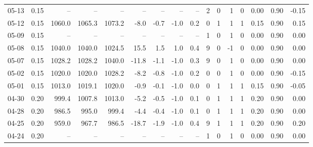 \begin{threeparttable}
{\begin{tabular}{lrrrrrrrrrrrrrrr}
  05-13 &     0.15 &     -- &     -- &     -- &         -- &             -- &                       -- &                  -- &              2 &         0 &     1 &         0 &       0.00 &      0.90 &          -0.15 \\
  05-12 &     0.15 & 1060.0 & 1065.3 & 1073.2 &       -8.0 &           -0.7 &                     -1.0 &                 0.2 &              0 &         1 &     1 &         1 &       0.15 &      0.90 &           0.15 \\
  05-09 &     0.15 &     -- &     -- &     -- &         -- &             -- &                       -- &                  -- &              1 &         0 &     1 &         0 &       0.00 &      0.90 &           0.00 \\
  05-08 &     0.15 & 1040.0 & 1040.0 & 1024.5 &       15.5 &            1.5 &                      1.0 &                 0.4 &              9 &         0 &    -1 &         0 &       0.00 &      0.90 &           0.00 \\
  05-07 &     0.15 & 1028.2 & 1028.2 & 1040.0 &      -11.8 &           -1.1 &                     -1.0 &                 0.3 &              9 &         0 &     1 &         0 &       0.00 &      0.90 &           0.00 \\
  05-02 &     0.15 & 1020.0 & 1020.0 & 1028.2 &       -8.2 &           -0.8 &                     -1.0 &                 0.2 &              0 &         0 &     1 &         0 &       0.00 &      0.90 &          -0.15 \\
  05-01 &     0.15 & 1013.0 & 1019.1 & 1020.0 &       -0.9 &           -0.1 &                     -1.0 &                 0.0 &              0 &         1 &     1 &         1 &       0.15 &      0.90 &          -0.05 \\
  04-30 &     0.20 &  999.4 & 1007.8 & 1013.0 &       -5.2 &           -0.5 &                     -1.0 &                 0.1 &              0 &         1 &     1 &         1 &       0.20 &      0.90 &           0.00 \\
  04-28 &     0.20 &  986.5 &  995.0 &  999.4 &       -4.4 &           -0.4 &                     -1.0 &                 0.1 &              0 &         1 &     1 &         1 &       0.20 &      0.90 &           0.00 \\
  04-25 &     0.20 &  959.0 &  967.7 &  986.5 &      -18.7 &           -1.9 &                     -1.0 &                 0.4 &              9 &         1 &     1 &         1 &       0.20 &      0.90 &           0.20 \\
  04-24 &     0.20 &     -- &     -- &     -- &         -- &             -- &                       -- &                  -- &              1 &         0 &     1 &         0 &       0.00 &      0.90 &           0.00 \\

\end{tabular}}
\end{threeparttable}
